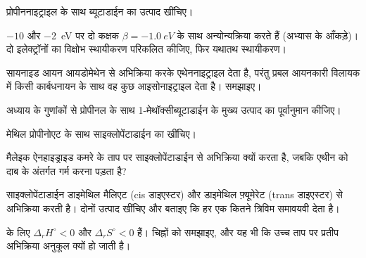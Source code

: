 \begin{exercise}[$\star$]\label{exo:b2:frontier-orbitals:4}
प्रोपीननाइट्राइल  के साथ ब्यूटाडाईन का उत्पाद खींचिए।
\end{exercise}

\begin{exercise}[$\star\star$]\label{exo:b2:frontier-orbitals:5}
$-10$ और \qty{-2}{eV} पर दो कक्षक $\beta = \qty{-1.0}{eV}$ के साथ अन्योन्यक्रिया करते हैं (अभ्यास के आँकड़े)।
दो इलेक्ट्रॉनों का विक्षोभ स्थायीकरण परिकलित कीजिए, फिर यथातथ स्थायीकरण।
\end{exercise}

\begin{exercise}[$\star\star$]\label{exo:b2:frontier-orbitals:6}
सायनाइड आयन आयडोमेथेन से अभिक्रिया करके एथेननाइट्राइल  देता है, परंतु
प्रबल आयनकारी विलायक में किसी कार्बधनायन के साथ वह कुछ आइसोनाइट्राइल  देता है। समझाइए।
\end{exercise}

\begin{exercise}[$\star\star$]\label{exo:b2:frontier-orbitals:7}
अध्याय के गुणांकों से प्रोपीनल के साथ 1-मेथॉक्सीब्यूटाडाईन के मुख्य उत्पाद का
पूर्वानुमान कीजिए।
\end{exercise}

\begin{exercise}[$\star\star$]\label{exo:b2:frontier-orbitals:8}
मेथिल प्रोपीनोएट के साथ साइक्लोपेंटाडाईन का  खींचिए।
\end{exercise}

\begin{exercise}[$\star\star$]\label{exo:b2:frontier-orbitals:9}
मैलेइक ऐनहाइड्राइड कमरे के ताप पर साइक्लोपेंटाडाईन से अभिक्रिया क्यों करता है, जबकि एथीन
को दाब के अंतर्गत गर्म करना पड़ता है?
\end{exercise}

\begin{exercise}[$\star\star\star$]\label{exo:b2:frontier-orbitals:10}
साइक्लोपेंटाडाईन डाइमेथिल मैलिएट (cis डाइएस्टर) और डाइमेथिल फ़्यूमेरेट
(trans डाइएस्टर) से अभिक्रिया करती है। दोनों उत्पाद खींचिए और बताइए कि हर एक कितने त्रिविम समावयवी देता है।
\end{exercise}

\begin{exercise}[$\star\star\star$]\label{exo:b2:frontier-orbitals:11}
 के लिए $\Delta_r H^\circ < 0$ और $\Delta_r S^\circ < 0$ हैं। चिह्नों को
समझाइए, और यह भी कि उच्च ताप पर प्रतीप अभिक्रिया अनुकूल क्यों हो जाती है।
\end{exercise}

